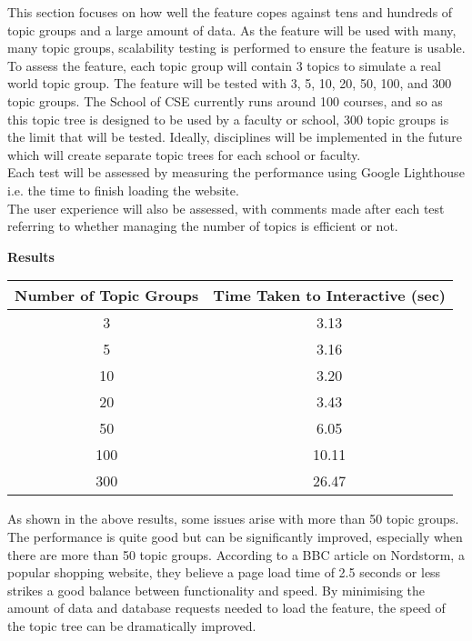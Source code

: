 This section focuses on how well the feature copes against tens and hundreds of topic groups and a large amount of data. As the feature will be used with many, many topic groups, scalability testing is performed to ensure the feature is usable.\\

To assess the feature, each topic group will contain 3 topics to simulate a real world topic group. The feature will be tested with 3, 5, 10, 20, 50, 100, and 300 topic groups. The School of CSE currently runs around 100 courses, and so as this topic tree is designed to be used by a faculty or school, 300 topic groups is the limit that will be tested. Ideally, disciplines will be implemented in the future which will create separate topic trees for each school or faculty. \\

Each test will be assessed by measuring the performance using Google Lighthouse i.e. the time to finish loading the website. \\
The user experience will also be assessed, with comments made after each test referring to whether managing the number of topics is efficient or not.

\textbf{Results}

\begin{center}
\begin{tabular}{||c c||} 
 \hline
 Number of Topic Groups & Time Taken to Interactive (sec) \\ [0.5ex] 
 \hline\hline
 3 & 3.13 \\ 
 \hline
 5 & 3.16 \\
 \hline
 10 & 3.20 \\
 \hline
 20 & 3.43 \\
 \hline
 50 & 6.05 \\ 
 \hline
 100 & 10.11 \\
 \hline
 300 & 26.47 \\ [1ex] 
 \hline
\end{tabular}
\end{center}

As shown in the above results, some issues arise with more than 50 topic groups. The performance is quite good but can be significantly improved, especially when there are more than 50 topic groups. According to a BBC article on Nordstorm, a popular shopping website, they believe a page load time of 2.5 seconds or less strikes a good balance between functionality and speed. By minimising the amount of data and database requests needed to load the feature, the speed of the topic tree can be dramatically improved.\\

